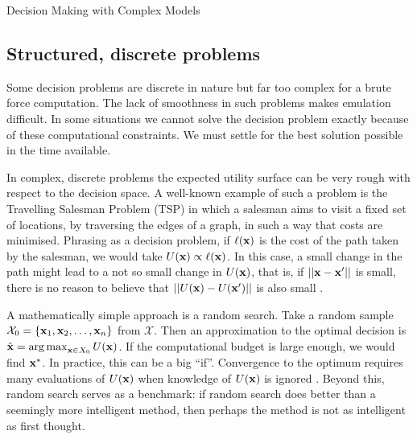 \begin{chapter}{Decision Making with Complex Models \label{Chap:optimisation}}
\subsection{Structured, discrete problems}
Some decision problems are discrete in nature but far too complex for a brute force computation. The lack of smoothness in such problems makes emulation difficult. In some situations we cannot solve the decision problem exactly because of these computational constraints. We must settle for the best solution possible in the time available.

In complex, discrete problems the expected utility surface can be very rough with respect to the decision space. A well-known example of such a problem is the Travelling Salesman Problem (TSP) in which a salesman aims to visit a fixed set of locations, by traversing the edges of a graph, in such a way that costs are minimised. Phrasing as a decision problem, if $\ell(\mathbf{x})$ is the cost of the path taken by the salesman, we would take $U(\mathbf{x}) \propto \ell(\mathbf{x})$. In this case, a small change in the path might lead to a not so small change in $U(\mathbf{x})$, that is, if $||\mathbf{x} - \mathbf{x}'||$ is small, there is no reason to believe that $||U(\mathbf{x}) - U(\mathbf{x}')||$ is also small \citep{Gutin2007}.

A mathematically simple approach is a random search. Take a random sample $\mathcal{X}_0 = \{ \mathbf{x}_1, \mathbf{x}_2, \ldots, \mathbf{x}_n\}$ from $\mathcal{X}$. Then an approximation to the optimal decision is $\hat{\mathbf{x}} = \operatorname*{arg\,max}_{\mathbf{x} \in X_0} U(\mathbf{x})$. If the computational budget is large enough, we would find $\mathbf{x}^{*}$. In practice, this can be a big ``if''. Convergence to the optimum requires many evaluations of $U(\mathbf{x})$ when knowledge of $U(\mathbf{x})$ is ignored \citep{Kan1989}. Beyond this, random search serves as a benchmark: if random search does better than a seemingly more intelligent method, then perhaps the method is not as intelligent as first thought.


\end{chapter}

